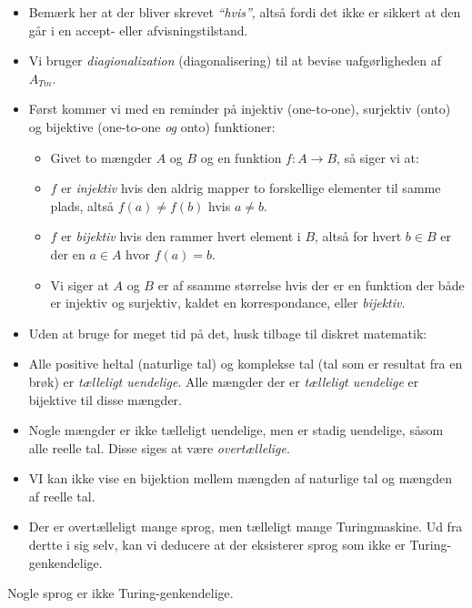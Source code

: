 \begin{frame}[allowframebreaks]
\begin{itemize}
		\item Bemærk her at der bliver skrevet \textit{``hvis''}, altså fordi det ikke er sikkert at den går i en accept- eller afvisningstilstand.
		\item Vi bruger \textit{diagionalization} (diagonalisering) til at bevise uafgørligheden af $A_{Tm}$.
		\item Først kommer vi med en reminder på injektiv (one-to-one), surjektiv (onto) og bijektive (one-to-one \textit{og} onto) funktioner:
		      \begin{itemize}
			      \item Givet to mængder $A$ og $B$ og en funktion $f : A \rightarrow B$, så siger vi at:
			      \item $f$ er \textit{injektiv} hvis den aldrig mapper to forskellige elementer til samme plads, altså $f(a) \ne f(b)$ hvis $a \ne b$.
			      \item $f$ er \textit{bijektiv} hvis den rammer hvert element i $B$, altså for hvert $b \in B$ er der en $a \in A$ hvor $f(a) = b$.
			      \item Vi siger at $A$ og $B$ er af ssamme størrelse hvis der er en funktion der både er injektiv og surjektiv, kaldet en korrespondance, eller \textit{bijektiv}.
		      \end{itemize}
		\item Uden at bruge for meget tid på det, husk tilbage til diskret matematik:
		\item Alle positive heltal (naturlige tal) og komplekse tal (tal som er resultat fra en brøk) er \textit{tælleligt uendelige}. Alle mængder der er \textit{tælleligt uendelige} er bijektive til disse mængder.
		\item Nogle mængder er ikke tælleligt uendelige, men er stadig uendelige, såsom alle reelle tal. Disse siges at være \textit{overtællelige}.
		\item VI kan ikke vise en bijektion mellem mængden af naturlige tal og mængden af reelle tal.
		\item Der er overtælleligt mange sprog, men tælleligt mange Turingmaskine. Ud fra dertte i sig selv, kan vi deducere at der eksisterer sprog som ikke er Turing-genkendelige.
	\end{itemize}

	\begin{corollary}
		Nogle sprog er ikke Turing-genkendelige.
	\end{corollary}


\end{frame}
